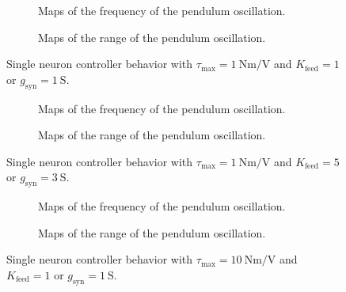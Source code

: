 \begin{figure}[!htbp]
    \centering
    \begin{subfigure}[t][.46\textheight][b]{\textwidth}
        \centering
        \caption{Maps of the frequency of the pendulum oscillation.}
        \label{fig:single_t1_low_freq}
    \end{subfigure}
    
    \begin{subfigure}[b][.46\textheight][t]{\textwidth}
        \centering
        \caption{Maps of the range of the pendulum oscillation.}
        \label{fig:single_t1_low_range}
    \end{subfigure}
    \caption{Single neuron controller behavior with $\tau_\text{max} = \qty{1}{\newton\meter\per\volt}$ and $K_\text{feed} = 1$ or $g_{\text{syn}} = \qty{1}{\siemens}$.}
    \label{fig:single_t1_low}
\end{figure}

\begin{figure}[!htbp]
    \centering
    \begin{subfigure}[t][.46\textheight][b]{\textwidth}
        \centering
        \caption{Maps of the frequency of the pendulum oscillation.}
        \label{fig:single_t1_high_freq}  
    \end{subfigure}
    
    \begin{subfigure}[b][.46\textheight][t]{\textwidth}
        \centering
        \caption{Maps of the range of the pendulum oscillation.}
        \label{fig:single_t1_high_range}  
    \end{subfigure}
    \caption{Single neuron controller behavior with $\tau_\text{max}=\qty{1}{\newton\meter\per\volt}$ and $K_\text{feed} = 5$ or $g_{\text{syn}} = \qty{3}{\siemens}$.}
    \label{fig:single_t1_high}
\end{figure}

\begin{figure}[!htbp]
    \centering
    \begin{subfigure}[t][.46\textheight][b]{\textwidth}
        \centering
        \caption{Maps of the frequency of the pendulum oscillation.}
        \label{fig:single_t10_low_freq}
    \end{subfigure}
    
    \begin{subfigure}[b][.46\textheight][t]{\textwidth}
        \centering
        \caption{Maps of the range of the pendulum oscillation.}
        \label{fig:single_t10_low_range}
    \end{subfigure}
    \caption{Single neuron controller behavior with $\tau_\text{max}=\qty{10}{\newton\meter\per\volt}$ and $K_\text{feed} = 1$ or $g_{\text{syn}} = \qty{1}{\siemens}$.}
    \label{fig:single_t10_low}
\end{figure}

